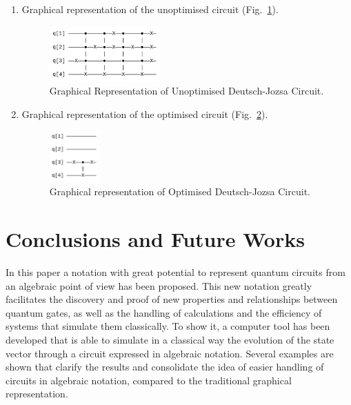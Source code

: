 \documentclass[sigconf,natbib=false]{acmart}
\begin{document}
\begin{enumerate}
            \item Graphical representation of the unoptimised circuit (Fig.~\ref{dj1_qc}).
            \begin{figure}[!ht]
                \centerline{\includegraphics[width=0.4\textwidth]{dj1_qc}}
                \caption{Graphical Representation of Unoptimised Deutsch-Jozsa Circuit.}
                \label{dj1_qc}
            \end{figure}

            \item Graphical representation of the optimised circuit (Fig.~\ref{dj2_qc}).
            \begin{figure}[!ht]
                \centerline{\includegraphics[width=0.18\textwidth]{dj2_qc}}
                \caption{Graphical representation of Optimised Deutsch-Jozsa Circuit.}
                \label{dj2_qc}
            \end{figure}
    \end{enumerate}
 
    \section{Conclusions and Future Works}
    In this paper a notation with great potential to represent quantum circuits from an algebraic point of view has been proposed. This new notation greatly facilitates the discovery and proof of new properties and relationships between quantum gates, as well as the handling of calculations and the efficiency of systems that simulate them classically. To show it, a computer tool has been developed that is able to simulate in a classical way the evolution of the state vector through a circuit expressed in algebraic notation. Several examples are shown that clarify the results and consolidate the idea of easier handling of circuits in algebraic notation, compared to the traditional graphical representation. %
    
\end{document}
